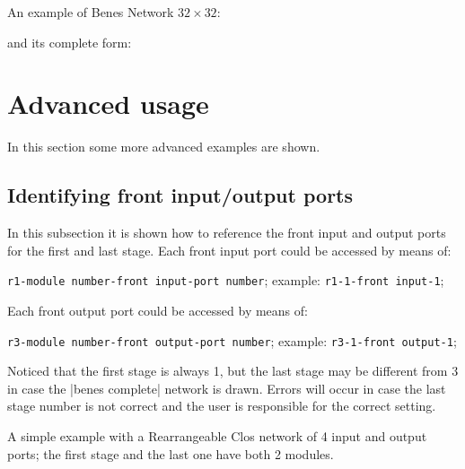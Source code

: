 \documentclass{ltxdoc} %
\begin{document}
An example of Benes Network $32 \times 32$:
\begin{codeexample}[]
\tikzset{module size=0.6cm,pin length factor=0.6,
         module ysep=0.9, module xsep=1.7,}
\begin{tikzpicture}[P=32]
    \node[benes] {};
\end{tikzpicture}
\end{codeexample}
and its complete form:
\begin{codeexample}[]
\tikzset{module size=0.6cm,pin length factor=0.6,
         module ysep=1, module xsep=2.275}
\begin{tikzpicture}[P=32]
    \node[benes complete={module label opacity=0}] {};
\end{tikzpicture}
\end{codeexample}


\section{Advanced usage}
In this section some more advanced examples are shown.

\subsection{Identifying front input/output ports}
In this subsection it is shown how to reference the front input and output ports for the first and last stage. Each front input port could be accessed by means of:
\begin{flushleft}
\verb|r1-|\bgroup\color{red!75!black}\verb|module number|\egroup\verb|-|\bgroup\color{red!75!black}\verb|front input|\egroup\verb|-|\bgroup\color{red!75!black}\verb|port number|\egroup; example: \verb|r1-1-front input-1|;
\end{flushleft}
Each front output port could be accessed by means of:
\begin{flushleft}
\verb|r3-|\bgroup\color{red!75!black}\verb|module number|\egroup\verb|-|\bgroup\color{red!75!black}\verb|front output|\egroup\verb|-|\bgroup\color{red!75!black}\verb|port number|\egroup; example: \verb|r3-1-front output-1|;
\end{flushleft}
Noticed that the first stage is always 1, but the last stage may be different from 3 in case the |benes complete| network is drawn. Errors will occur in case the last stage number is not correct and the user is responsible for the correct setting.

A simple example with a Rearrangeable Clos network of 4 input and output ports; the first stage and the last one have both 2 modules.
\end{document}

